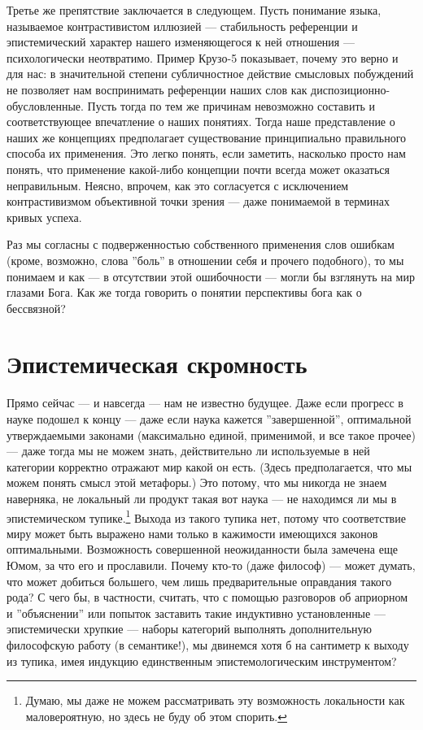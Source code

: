 \documentclass[11pt]{book}
\begin{document}
Третье же препятствие заключается в следующем. Пусть понимание языка, называемое контрастивистом иллюзией --- стабильность референции и эпистемический характер нашего изменяющегося к ней отношения --- психологически неотвратимо. Пример Крузо-5 показывает, почему это верно и для нас: в значительной степени субличностное действие смысловых побуждений не позволяет нам воспринимать референции наших слов как диспозиционно-обусловленные. Пусть тогда по тем же причинам невозможно составить и соответствующее впечатление о наших понятиях. Тогда наше представление о наших же концепциях предполагает существование принципиально правильного способа их применения. Это легко понять, если заметить, насколько просто нам понять, что применение какой-либо концепции почти всегда может оказаться неправильным. Неясно, впрочем, как это согласуется с исключением контрастивизмом объективной точки зрения --- даже понимаемой в терминах кривых успеха.

Раз мы согласны с подверженностью собственного применения слов ошибкам (кроме, возможно, слова ''боль'' в отношении себя и прочего подобного), то мы понимаем и как --- в отсутствии этой ошибочности --- могли бы взглянуть на мир глазами Бога. Как же тогда говорить о понятии перспективы бога как о бессвязной?

\section{Эпистемическая скромность}

Прямо сейчас --- и навсегда --- нам не известно будущее. Даже если прогресс в науке подошел к концу --- даже если наука кажется ''завершенной'', оптимальной утверждаемыми законами (максимально единой, применимой, и все такое прочее) --- даже тогда мы не можем знать, действительно ли используемые в ней категории корректно отражают мир какой он есть. (Здесь предполагается, что мы можем понять смысл этой метафоры.) Это потому, что мы никогда не знаем наверняка, не локальный ли продукт такая вот наука --- не находимся ли мы в эпистемическом тупике.\footnote{Думаю, мы даже не можем рассматривать эту возможность локальности как маловероятную, но здесь не буду об этом спорить.} Выхода из такого тупика нет, потому что соответствие миру может быть выражено нами только в кажимости имеющихся законов оптимальными. Возможность совершенной неожиданности была замечена еще Юмом, за что его и прославили. Почему кто-то (даже философ) --- может думать, что может добиться большего, чем лишь предварительные оправдания такого рода? С чего бы, в частности, считать, что с помощью разговоров об априорном и ''объяснении'' или попыток заставить такие индуктивно установленные --- эпистемически хрупкие --- наборы категорий выполнять дополнительную философскую работу (в семантике!), мы двинемся хотя б на сантиметр к выходу из тупика, имея индукцию единственным эпистемологическим инструментом?
\end{document}
